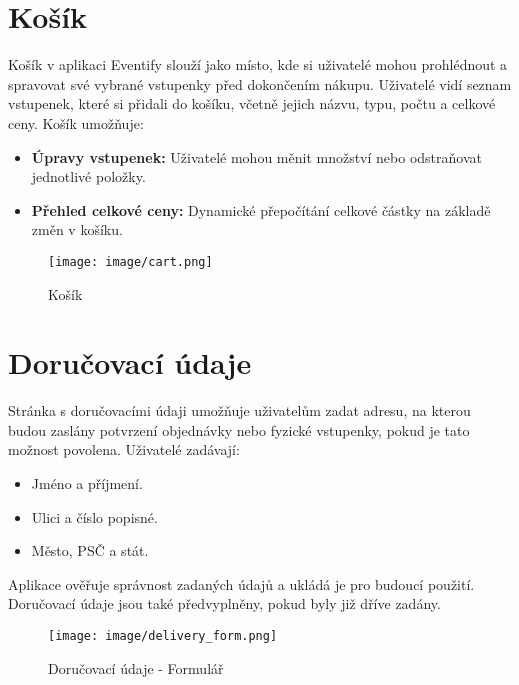 \documentclass[12pt, a4paper,
twoside,        %
openright
]{report}
\begin{document}
	\clearpage
	
	\section{Košík}
	Košík v aplikaci Eventify slouží jako místo, kde si uživatelé mohou prohlédnout a spravovat své vybrané vstupenky před dokončením nákupu. Uživatelé vidí seznam vstupenek, které si přidali do košíku, včetně jejich názvu, typu, počtu a celkové ceny. Košík umožňuje:
	
	\begin{itemize}
		\item \textbf{Úpravy vstupenek:} Uživatelé mohou měnit množství nebo odstraňovat jednotlivé položky.
		\item \textbf{Přehled celkové ceny:} Dynamické přepočítání celkové částky na základě změn v košíku.
	\end{itemize}
	
	\begin{figure}[h!]
		\centering %
		\texttt{[image: image/cart.png]} %
		\caption{Košík} %
		\label{fig:cart} %
	\end{figure}
	
	\section{Doručovací údaje}
	Stránka s doručovacími údaji umožňuje uživatelům zadat adresu, na kterou budou zaslány potvrzení objednávky nebo fyzické vstupenky, pokud je tato možnost povolena. Uživatelé zadávají:
	
	\begin{itemize}
		\item  Jméno a příjmení.
		\item Ulici a číslo popisné.
		\item Město, PSČ a stát.
	\end{itemize}
	
	Aplikace ověřuje správnost zadaných údajů a ukládá je pro budoucí použití. Doručovací údaje jsou také předvyplněny, pokud byly již dříve zadány.
	
	\begin{figure}[h!]
		\centering %
		\texttt{[image: image/delivery\_form.png]} %
		\caption{Doručovací údaje - Formulář} %
		\label{fig:deliveryform} %
	\end{figure}
	
\end{document}
